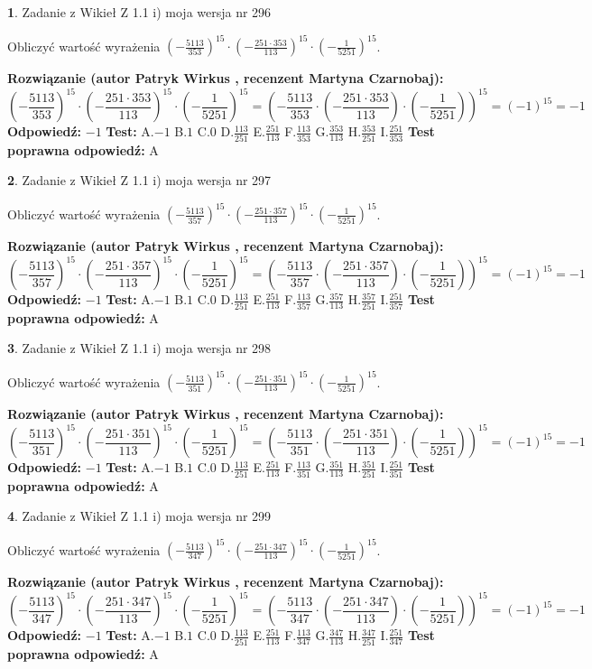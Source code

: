 \documentclass[12pt, a4paper]{article}
\theoremstyle{definition} %
\newtheorem{zad}{}
\newcommand{\zadStart}[1]{\begin{zad}#1\newline}
\newcommand{\zadStop}{\end{zad}}
\newcommand{\rozwStart}[2]{\noindent \textbf{Rozwiązanie (autor #1 , recenzent #2): }\newline}
\newcommand{\rozwStop}{\newline}
\newcommand{\odpStart}{\noindent \textbf{Odpowiedź:}\newline}
\newcommand{\odpStop}{\newline}
\newcommand{\testStart}{\noindent \textbf{Test:}\newline}
\newcommand{\testStop}{\newline}
\newcommand{\kluczStart}{\noindent \textbf{Test poprawna odpowiedź:}\newline}
\newcommand{\kluczStop}{\newline}
\begin{document}
\zadStart{Zadanie z Wikieł Z 1.1 i) moja wersja nr 296}

Obliczyć wartość wyrażenia $(-\frac{5113}{353})^{15} \cdot (-\frac{251 \cdot 353}{113})^{15} \cdot (-\frac{1}{5251})^{15}$.
\zadStop
\rozwStart{Patryk Wirkus}{Martyna Czarnobaj}
$$(-\frac{5113}{353})^{15} \cdot (-\frac{251 \cdot 353}{113})^{15} \cdot (-\frac{1}{5251})^{15} = (-\frac{5113}{353} \cdot (-\frac{251 \cdot 353}{113}) \cdot (-\frac{1}{5251}))^{15} = (-1)^{15} = -1$$
\rozwStop
\odpStart
$-1$
\odpStop
\testStart
A.$-1$ B.$1$ C.$0$ D.$\frac{113}{251}$ E.$\frac{251}{113}$
F.$\frac{113}{353}$ G.$\frac{353}{113}$
H.$\frac{353}{251}$
I.$\frac{251}{353}$
\testStop
\kluczStart
A
\kluczStop



\zadStart{Zadanie z Wikieł Z 1.1 i) moja wersja nr 297}

Obliczyć wartość wyrażenia $(-\frac{5113}{357})^{15} \cdot (-\frac{251 \cdot 357}{113})^{15} \cdot (-\frac{1}{5251})^{15}$.
\zadStop
\rozwStart{Patryk Wirkus}{Martyna Czarnobaj}
$$(-\frac{5113}{357})^{15} \cdot (-\frac{251 \cdot 357}{113})^{15} \cdot (-\frac{1}{5251})^{15} = (-\frac{5113}{357} \cdot (-\frac{251 \cdot 357}{113}) \cdot (-\frac{1}{5251}))^{15} = (-1)^{15} = -1$$
\rozwStop
\odpStart
$-1$
\odpStop
\testStart
A.$-1$ B.$1$ C.$0$ D.$\frac{113}{251}$ E.$\frac{251}{113}$
F.$\frac{113}{357}$ G.$\frac{357}{113}$
H.$\frac{357}{251}$
I.$\frac{251}{357}$
\testStop
\kluczStart
A
\kluczStop



\zadStart{Zadanie z Wikieł Z 1.1 i) moja wersja nr 298}

Obliczyć wartość wyrażenia $(-\frac{5113}{351})^{15} \cdot (-\frac{251 \cdot 351}{113})^{15} \cdot (-\frac{1}{5251})^{15}$.
\zadStop
\rozwStart{Patryk Wirkus}{Martyna Czarnobaj}
$$(-\frac{5113}{351})^{15} \cdot (-\frac{251 \cdot 351}{113})^{15} \cdot (-\frac{1}{5251})^{15} = (-\frac{5113}{351} \cdot (-\frac{251 \cdot 351}{113}) \cdot (-\frac{1}{5251}))^{15} = (-1)^{15} = -1$$
\rozwStop
\odpStart
$-1$
\odpStop
\testStart
A.$-1$ B.$1$ C.$0$ D.$\frac{113}{251}$ E.$\frac{251}{113}$
F.$\frac{113}{351}$ G.$\frac{351}{113}$
H.$\frac{351}{251}$
I.$\frac{251}{351}$
\testStop
\kluczStart
A
\kluczStop



\zadStart{Zadanie z Wikieł Z 1.1 i) moja wersja nr 299}

Obliczyć wartość wyrażenia $(-\frac{5113}{347})^{15} \cdot (-\frac{251 \cdot 347}{113})^{15} \cdot (-\frac{1}{5251})^{15}$.
\zadStop
\rozwStart{Patryk Wirkus}{Martyna Czarnobaj}
$$(-\frac{5113}{347})^{15} \cdot (-\frac{251 \cdot 347}{113})^{15} \cdot (-\frac{1}{5251})^{15} = (-\frac{5113}{347} \cdot (-\frac{251 \cdot 347}{113}) \cdot (-\frac{1}{5251}))^{15} = (-1)^{15} = -1$$
\rozwStop
\odpStart
$-1$
\odpStop
\testStart
A.$-1$ B.$1$ C.$0$ D.$\frac{113}{251}$ E.$\frac{251}{113}$
F.$\frac{113}{347}$ G.$\frac{347}{113}$
H.$\frac{347}{251}$
I.$\frac{251}{347}$
\testStop
\kluczStart
A
\kluczStop
\end{document}
